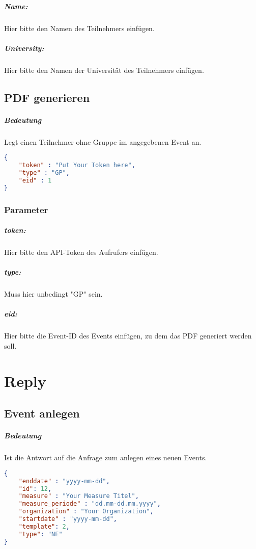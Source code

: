 \documentclass[12pt,parskip=full, pagea4]{scrreprt}
\begin{document}
			\paragraph{Name:}Hier bitte den Namen des Teilnehmers einf\"ugen.
			\paragraph{University:}Hier bitte den Namen der Universit\"at des Teilnehmers einf\"ugen.
			
			\section{PDF generieren}
			\paragraph{Bedeutung} Legt einen Teilnehmer ohne Gruppe im angegebenen Event an.
			\begin{lstlisting}[language=JSON]
{
	"token" : "Put Your Token here",
	"type" : "GP",
	"eid" : 1
}
			\end{lstlisting}
			\subsection{Parameter}
			\paragraph{token:}Hier bitte den API-Token des Aufrufers einf\"ugen.
			\paragraph{type:}Muss hier unbedingt "GP" sein.
			\paragraph{eid:}Hier bitte die Event-ID des Events einf\"ugen, zu dem das PDF generiert werden soll.
			
		\chapter{Reply}
			\section{Event anlegen}
			\paragraph{Bedeutung} Ist die Antwort auf die Anfrage zum anlegen eines neuen Events.
			\begin{lstlisting}[language=JSON]
{
	"enddate" : "yyyy-mm-dd",
	"id": 12,
	"measure" : "Your Measure Titel",
	"measure_periode" : "dd.mm-dd.mm.yyyy",
	"organization" : "Your Organization",
	"startdate" : "yyyy-mm-dd",
	"template": 2,
	"type": "NE"
}
			\end{lstlisting}
\end{document}
